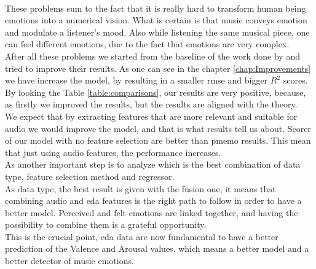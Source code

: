 \\ \indent
These problems sum to the fact that it is really hard to transform human being emotions into a numerical vision. What is certain is that music conveys emotion and modulate a listener's mood. Also while listening the same musical piece, one can feel different emotions, due to the fact that emotions are very complex.
\\
After all these problems we started from the baseline of the work done by \cite{zhang2018pmemo} and tried to improve their results. As one can see in the chapter \ref{chap:Improvements} we have increase the model, by resulting in a smaller \gls{rmse} and bigger $R^2$ scores.
\\ \indent
By looking the Table \ref{table:comparisons}, our results are very positive, because, as firstly we improved the results, but the results are aligned with the theory.
\\
We expect that by extracting features that are more relevant and suitable for audio we would improve the model, and that is what results tell us about. Scorer of our model with no feature selection are better than  \gls{pmemo} results. This mean that just using audio features, the performance increases.
\\ \indent
As another important step is to analyze which is the best combination of data type, feature selection method and regressor.
\\
As data type, the best result is given with the fusion one, it means that combining audio and \gls{eda} features is the right path to follow in order to have a better model. Perceived and felt emotions are linked together, and having the possibility to combine them is a grateful opportunity.
\\
This is the crucial point, \gls{eda} data are now fundamental to have a better prediction of the Valence and Arousal values, which means a better model and a better detector of music emotions.


